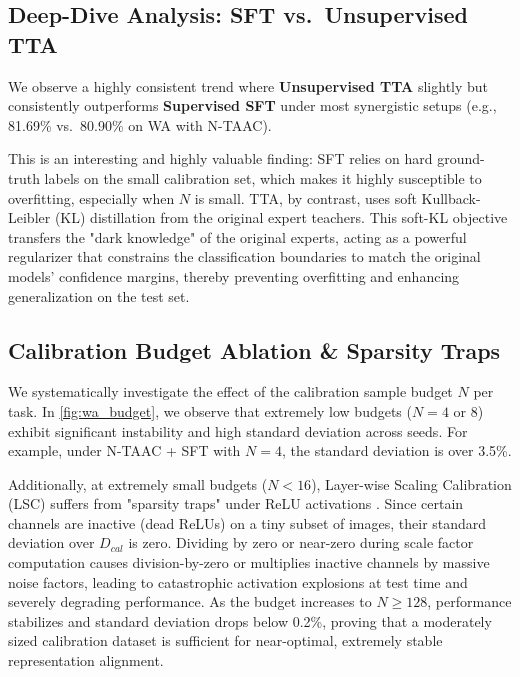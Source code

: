 \documentclass{article}
\theoremstyle{plain}
\theoremstyle{definition}
\theoremstyle{remark}
\begin{document}
\subsection{Deep-Dive Analysis: SFT vs.\ Unsupervised TTA}
We observe a highly consistent trend where \textbf{Unsupervised TTA} slightly but consistently outperforms \textbf{Supervised SFT} under most synergistic setups (e.g., 81.69\% vs.\ 80.90\% on WA with N-TAAC). 

This is an interesting and highly valuable finding: SFT relies on hard ground-truth labels on the small calibration set, which makes it highly susceptible to overfitting, especially when $N$ is small. TTA, by contrast, uses soft Kullback-Leibler (KL) distillation from the original expert teachers. This soft-KL objective transfers the "dark knowledge" of the original experts, acting as a powerful regularizer that constrains the classification boundaries to match the original models' confidence margins, thereby preventing overfitting and enhancing generalization on the test set.

\subsection{Calibration Budget Ablation \& Sparsity Traps}
We systematically investigate the effect of the calibration sample budget $N$ per task. In \cref{fig:wa_budget}, we observe that extremely low budgets ($N=4$ or $8$) exhibit significant instability and high standard deviation across seeds. For example, under N-TAAC + SFT with $N=4$, the standard deviation is over 3.5\%.

Additionally, at extremely small budgets ($N < 16$), Layer-wise Scaling Calibration (LSC) suffers from "sparsity traps" under ReLU activations \cite{choshen2022fusing}. Since certain channels are inactive (dead ReLUs) on a tiny subset of images, their standard deviation over $D_{cal}$ is zero. Dividing by zero or near-zero during scale factor computation causes division-by-zero or multiplies inactive channels by massive noise factors, leading to catastrophic activation explosions at test time and severely degrading performance. As the budget increases to $N \ge 128$, performance stabilizes and standard deviation drops below 0.2\%, proving that a moderately sized calibration dataset is sufficient for near-optimal, extremely stable representation alignment.
\end{document}

